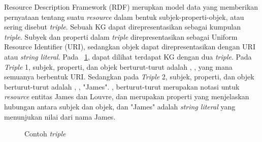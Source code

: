 Resource Description Framework (RDF) merupkan model data yang memberikan pernyataan tentang suatu
\textit{resource} dalam bentuk subjek-properti-objek, atau sering disebut \textit{triple}. Sebuah KG
dapat direpresentasikan sebagai kumpulan \textit{triple}. Subyek dan properti dalam \textit{triple}
direpresentasikan sebagai Uniform Resource Identifier (URI), sedangkan objek dapat direpresentasikan
dengan URI atau \textit{string literal}. Pada \pic~\ref{fig:triple-example}, dapat dilihat terdapat
KG dengan dua \textit{triple}. Pada \textit{Triple} 1, subjek, properti, dan objek berturut-turut
adalah , ,
 yang mana semuanya berbentuk URI. Sedangkan pada \textit{Triple}
2, subjek, properti, dan objek berturut-turut adalah ,
, "James". ,
 berturut-turut merupakan notasi untuk \textit{resource} entitas
James dan Louvre,  dan 
merupakan properti yang menjelaskan hubungan antara subjek dan objek, dan "James" adalah
\textit{string literal} yang menunjukan nilai dari nama James.

\begin{figure}
  \centering
  \caption{Contoh \textit{triple}}
  \label{fig:triple-example}
\end{figure}



